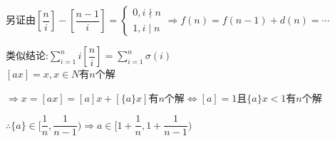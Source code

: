 另证由$ [\dfrac{n}{i}]-[\dfrac{n-1}{i}]= \begin{cases} 0,i\nmid n\\ 1,i \mid n \end{cases}\Rightarrow f(n)=f(n-1)+d(n)=\cdots$

类似结论:$ \sum_{i=1}^{n}{i[\dfrac{n}{i}]}=\sum_{i=1}^{n}{\sigma(i)}$
\\

$ [ax]=x,x\in N$有$ n$个解

$ \Rightarrow x=[ax]=[a]x+[\{ a\}x]$有$ n$个解$ \Leftrightarrow [a]=1$且$ \{ a\}x<1$有$ n$个解

$ \therefore \{ a\}\in [\dfrac{1}{n},\dfrac{1}{n-1})\Rightarrow a \in [1+\dfrac{1}{n},1+\dfrac{1}{n-1})$
\\


